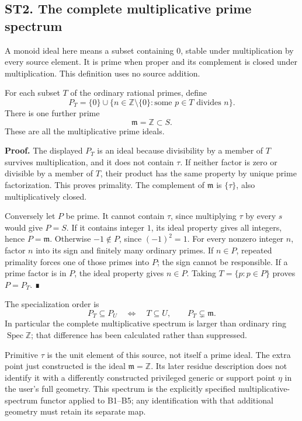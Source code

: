 \subsection{ST2. The complete multiplicative prime
spectrum}\label{st2.-the-complete-multiplicative-prime-spectrum}

A monoid ideal here means a subset containing \(0\), stable under
multiplication by every source element. It is prime when proper and its
complement is closed under multiplication. This definition uses no
source addition.

For each subset \(T\) of the ordinary rational primes, define \[
 P_T=\{0\}\cup
 \{n\in\mathbb Z\setminus\{0\}:\text{some }p\in T\text{ divides }n\}.
\tag{ST2.1}
\] There is one further prime \[
 \mathfrak m=\mathbb Z\subset S.
\tag{ST2.2}
\] These are all the multiplicative prime ideals.

\textbf{Proof.} The displayed \(P_T\) is an ideal because divisibility
by a member of \(T\) survives multiplication, and it does not contain
\(\tau\). If neither factor is zero or divisible by a member of \(T\),
their product has the same property by unique prime factorization. This
proves primality. The complement of \(\mathfrak m\) is \(\{\tau\}\),
also multiplicatively closed.

Conversely let \(P\) be prime. It cannot contain \(\tau\), since
multiplying \(\tau\) by every \(s\) would give \(P=S\). If it contains
integer \(1\), its ideal property gives all integers, hence
\(P=\mathfrak m\). Otherwise \(-1\notin P\), since \((-1)^2=1\). For
every nonzero integer \(n\), factor \(n\) into its sign and finitely
many ordinary primes. If \(n\in P\), repeated primality forces one of
those primes into \(P\); the sign cannot be responsible. If a prime
factor is in \(P\), the ideal property gives \(n\in P\). Taking
\(T=\{p:p\in P\}\) proves \(P=P_T\). ∎

The specialization order is \[
 P_T\subseteq P_U\quad\Longleftrightarrow\quad T\subseteq U,
 \qquad P_T\subsetneq\mathfrak m.
\tag{ST2.3}
\] In particular the complete multiplicative spectrum is larger than
ordinary ring \(\operatorname{Spec}\mathbb Z\); that difference has been
calculated rather than suppressed.

Primitive \(\tau\) is the unit element of this source, not itself a
prime ideal. The extra point just constructed is the ideal
\(\mathfrak m=\mathbb Z\). Its later residue description does not
identify it with a differently constructed privileged generic or support
point \(\eta\) in the user's full geometry. This spectrum is the
explicitly specified multiplicative-spectrum functor applied to B1--B5;
any identification with that additional geometry must retain its
separate map.

